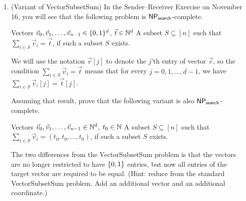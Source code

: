 \documentclass[11pt]{article}
\begin{document}
\begin{enumerate}
\newpage

\item (Variant of VectorSubsetSum)  
In the Sender--Receiver Exercise on November 16, you will see that the following problem is $\mathsf{NP_{search}}$-complete.

{Vectors $\vec{v}_0,\vec{v}_1,\ldots,\vec{v}_{n-1}\in \{0,1\}^d$, $\vec{t}\in \mathbb{N}^d$}
{A subset $S\subseteq [n]$ such that $\sum_{i\in S}\vec{v}_i = \vec{t}$, if such a subset $S$ exists.}

We will use the notation $\vec{v}[j]$ to denote the $j$'th entry of vector $\vec{v}$, so the condition 
$\sum_{i\in S}\vec{v}_i = \vec{t}$ means that for every $j=0,1,\ldots,d-1$, we have $\sum_{i\in S}\vec{v}_i[j] = \vec{t}[j]$.

Assuming that result, prove that the following variant is also $\mathsf{NP_{search}}$-complete.
    
{Vectors $\vec{v}_0,\vec{v}_1,\ldots,\vec{v}_{n-1}\in \mathbb{N}^d$, $t_0\in \mathbb{N}$}
{A subset $S\subseteq [n]$ such that $\sum_{i\in S}\vec{v}_i = (t_0,t_0,\ldots,t_0)$, if such a subset $S$ exists.}

    The two differences from the VectorSubsetSum problem is that the vectors are no longer restricted to have $\{0,1\}$ entries, but now all entries of the target vector are required to be equal. (Hint: reduce from the standard VectorSubsetSum problem.  Add an additional vector and an additional coordinate.)

    \end{enumerate}
    
\end{document}
